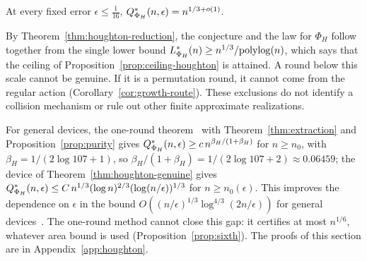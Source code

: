 \begin{conjecture}\label{conj:houghton}
At every fixed error $\epsilon\le\frac1{16}$, $Q^{*}_{\Phi_H}(n,\epsilon)=n^{1/3+o(1)}$.
\end{conjecture}

By Theorem~\ref{thm:houghton-reduction}, the conjecture and the law for $\Phi_H$ follow together from the single lower bound
$L^{*}_{\Phi_H}(n)\ge n^{1/3}/\mathrm{polylog}(n)$, which says that the ceiling of Proposition~\ref{prop:ceiling-houghton} is attained.
A round below this scale cannot be genuine. If it is a permutation
round, it cannot come from the regular action
(Corollary~\ref{cor:growth-route}). These exclusions do not identify
a collision mechanism or rule out other finite approximate realizations.

\begin{remark}\label{rem:general-houghton}
For general devices, the one-round theorem~\cite[Theorem~5.5]{DouglasMghirbiB} with Theorem~\ref{thm:extraction} and Proposition~\ref{prop:purity}
gives $Q^{*}_{\Phi_H}(n,\epsilon)\ge c\,n^{\beta_H/(1+\beta_H)}$ for $n\ge n_0$, with $\beta_H=1/(2\log107+1)$, so $\beta_H/(1+\beta_H)=1/(2\log107+2)\approx0.06459$; the device of
Theorem~\ref{thm:houghton-genuine} gives $Q^{*}_{\Phi_H}(n,\epsilon)\le C\,n^{1/3}(\log n)^{2/3}(\log(n/\epsilon))^{1/3}$ for $n\ge n_0(\epsilon)$. This improves the dependence on $\epsilon$ in the
bound $O((n/\epsilon)^{1/3}\log^{4/3}(2n/\epsilon))$ for general devices~\cite[Corollary~6.7]{DouglasMghirbiB}. The one-round method cannot close this gap: it certifies at most $n^{1/6}$, whatever area
bound is used (Proposition~\ref{prop:sixth}). The proofs of this section are in Appendix~\ref{app:houghton}.
\end{remark}
